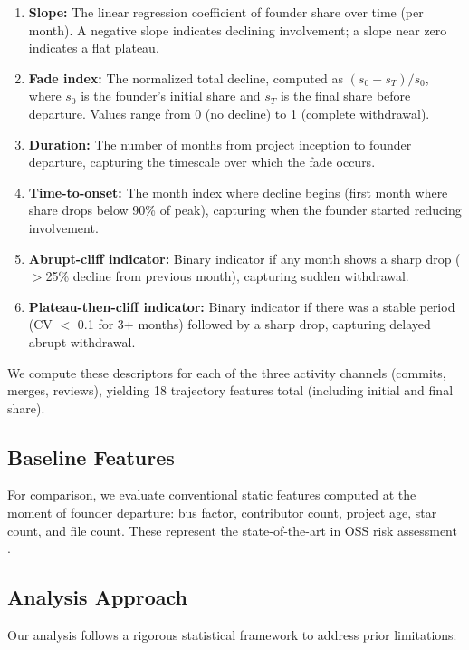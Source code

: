 \documentclass[11pt,letterpaper]{article}
\begin{document}
\begin{enumerate}
  \item \textbf{Slope:} The linear regression coefficient of founder share over time (per month). A negative slope indicates declining involvement; a slope near zero indicates a flat plateau.
  \item \textbf{Fade index:} The normalized total decline, computed as $(s_0 - s_T) / s_0$, where $s_0$ is the founder's initial share and $s_T$ is the final share before departure. Values range from 0 (no decline) to 1 (complete withdrawal).
  \item \textbf{Duration:} The number of months from project inception to founder departure, capturing the timescale over which the fade occurs.
  \item \textbf{Time-to-onset:} The month index where decline begins (first month where share drops below 90\% of peak), capturing when the founder started reducing involvement.
  \item \textbf{Abrupt-cliff indicator:} Binary indicator if any month shows a sharp drop ($>$25\% decline from previous month), capturing sudden withdrawal.
  \item \textbf{Plateau-then-cliff indicator:} Binary indicator if there was a stable period (CV $<$ 0.1 for 3+ months) followed by a sharp drop, capturing delayed abrupt withdrawal.
\end{enumerate}

We compute these descriptors for each of the three activity channels (commits, merges, reviews), yielding 18 trajectory features total (including initial and final share).

\subsection{Baseline Features}

For comparison, we evaluate conventional static features computed at the moment of founder departure: bus factor, contributor count, project age, star count, and file count. These represent the state-of-the-art in OSS risk assessment \citep{Avelino2019,Gousios2018}.

\subsection{Analysis Approach}

Our analysis follows a rigorous statistical framework to address prior limitations:
\end{document}
